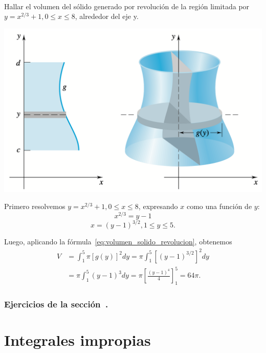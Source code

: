 \begin{example} $ $

\noindent
\begin{minipage}{.3\textwidth}
Hallar el volumen del sólido generado por revolución de la región limitada por 
$y = x^{2/3} + 1, 0 \leq x \leq 8$, alrededor del eje y.
\end{minipage} 
\begin{minipage}{.69\textwidth}
\begin{center}
  \includegraphics[width=.8\textwidth]{pics/volumen-raro-revolucion.png}
\end{center}
\end{minipage}

Primero resolvemos $y = x^{2/3} + 1, 0 \leq x \leq 8$, expresando $x$ como una función de $y$:
\[
x^{2/3} = y - 1
\]
\[
x = (y - 1)^{3/2}, 1 \leq y \leq 5.
\]

Luego, aplicando la fórmula~\eqref{eq:volumen_solido_revolucion}, obtenemos
\begin{align*}
  V &= \int_1^5 \pi[g(y)]^2 dy = \pi \int_1^5 [(y - 1)^{3/2}]^2 dy
  \\
  &= \pi \int_1^5 (y - 1)^3 dy = \pi \left[\frac{(y - 1)^4}{4}\right]_1^5 = 64\pi.
\end{align*}
\end{example}

\subsubsection*{Ejercicios de la sección~.}

\begin{enumerate}
  
\end{enumerate}

\section{Integrales impropias}

